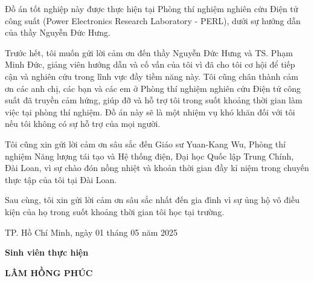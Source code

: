 \clearpage
{}

Đồ án tốt nghiệp này được thực hiện tại Phòng thí nghiệm nghiên cứu Điện tử công suất (Power Electronics Research Laboratory - PERL), dưới sự hướng dẫn của thầy Nguyễn Đức Hưng. \par
Trước hết, tôi muốn gửi lời cảm ơn đến thầy Nguyễn Đức Hưng và TS. Phạm Minh Đức, giảng viên hướng dẫn và cố vấn của tôi vì đã cho tôi cơ hội để tiếp cận và nghiên cứu trong lĩnh vực đầy tiềm năng này. Tôi cũng chân thành cảm ơn các anh chị, các bạn và các em ở Phòng thí nghiệm nghiên cứu Điện tử công suất đã truyền cảm hứng, giúp đỡ và hỗ trợ tôi trong suốt khoảng thời gian làm việc tại phòng thí nghiệm. Đồ án này sẽ là một nhiệm vụ khó khăn đối với tôi nếu tôi không có sự hỗ trợ của mọi người. \par
Tôi cũng xin gửi lời cảm ơn sâu sắc đến Giáo sư Yuan-Kang Wu, Phòng thí nghiệm Năng lượng tái tạo và Hệ thống điện, Đại học Quốc lập Trung Chính, Đài Loan, vì sự chào đón nồng nhiệt và khoản thời gian đầy kỉ niệm trong chuyến thực tập của tôi tại Đài Loan. \par
Sau cùng, tôi xin gửi lời cảm ơn sâu sắc nhất đến gia đình vì sự ủng hộ vô điều kiện của họ trong suốt khoảng thời gian tôi học tại trường. \par

\vspace{1.5cm}
\hspace{6cm} TP. Hồ Chí Minh, ngày 01 tháng 05 năm 2025 

\hspace{8cm} \textbf{Sinh viên thực hiện}

\vspace{2.5cm}
\hspace{8cm} \textbf{LÂM HỒNG PHÚC}